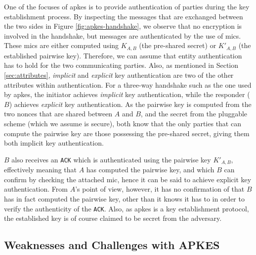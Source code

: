 One of the focuses of \gls{apkes} is to provide authentication of parties during the key establishment process. By inspecting the messages that are exchanged between the two sides in Figure \ref{fig:apkes-handshake}, we observe that no encryption is involved in the handshake, but messages are authenticated by the use of \gls{mic}s. These \gls{mic}s are either computed using $K_{A,B}$ (the pre-shared secret) or $K'_{A,B}$ (the established pairwise key). Therefore, we can assume that entity authentication has to hold for the two communicating parties. Also, as mentioned in Section \ref{sec:attributes}, \emph{implicit} and \emph{explicit} key authentication are two of the other attributes within authentication. For a three-way handshake such as the one used by \gls{apkes}, the initiator achieves \emph{implicit} key authentication, while the responder ($B$) achieves \emph{explicit} key authentication. As the pairwise key is computed from the two nonces that are shared between $A$ and $B$, and the secret from the pluggable scheme (which we assume is secure), both know that the only parties that can compute the pairwise key are those possessing the pre-shared secret, giving them both implicit key authentication. 

$B$ also receives an \texttt{ACK} which is authenticated using the pairwise key $K'_{A,B}$, effectively meaning that $A$ has computed the pairwise key, and which $B$ can confirm by checking the attached \gls{mic}, hence it can be said to achieve explicit key authentication. From $A$'s point of view, however, it has no confirmation of that $B$ has in fact computed the pairwise key, other than it knows it has to in order to verify the authenticity of the \texttt{ACK}. Also, as \gls{apkes} is a key establishment protocol, the established key is of course claimed to be secret from the adversary.

\subsection{Weaknesses and Challenges with APKES}
\label{subsec:apkes-weakness}

